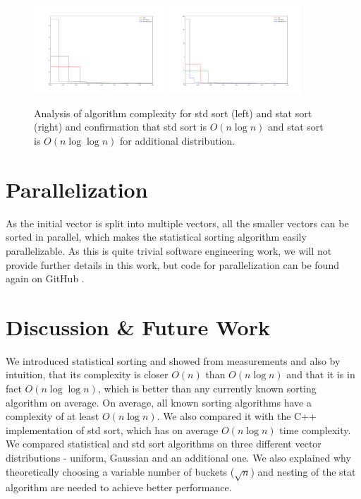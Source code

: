 \documentclass[12pt]{article}
\begin{document}
                \begin{figure}
		\begin{center}
			\includegraphics[width=0.44\textwidth]{fig_dist_anal_weird_stdsort.png}
			\includegraphics[width=0.44\textwidth]{fig_dist_anal_weird_statsort.png}
		\end{center}
		\caption{Analysis of algorithm complexity for std sort (left) and stat sort (right) and confirmation that std sort is $O(n \log n)$ and stat sort is $O(n \log \log n)$ for additional distribution.}
		\label{fig7}
		\end{figure}	
	\section{Parallelization}
	
	As the initial vector is split into multiple vectors, all the smaller vectors can be sorted in parallel, which makes the statistical sorting algorithm easily parallelizable. As this is quite trivial software engineering work, we will not provide further details in this work, but code for parallelization can be found again on GitHub \cite{peta78b}.

	\section{Discussion \& Future Work}
	
	We introduced statistical sorting and showed from measurements and also by intuition, that its complexity is closer $O(n)$ than $O(n \log n)$ and that it is in fact $O(n \log \log n)$, which is better than any currently known sorting algorithm on average. On average, all known sorting algorithms have a complexity of at least $O(n \log n)$. We also compared it with the C++ implementation of std sort, which has on average $O(n \log n)$ time complexity. We compared statistical and std sort algorithms on three different vector distributions - uniform, Gaussian and an additional one. We also explained why theoretically choosing a variable number of buckets ($\sqrt{n}$) and nesting of the stat algorithm are needed to achieve better performance.
	
\end{document}
